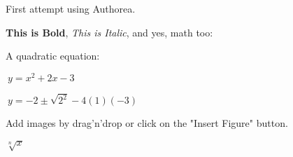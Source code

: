 First attempt using Authorea.

\textbf{This is Bold}, \textit{This is Italic}, and yes, math too:

A quadratic equation:

$\ y = x^{2} + 2x -3 $

$\ y = -2 \pm \sqrt{2^{2}}-4(1)(-3)$




Add images by drag'n'drop or click on the "Insert Figure" button.

$\sqrt[n]{x}$
